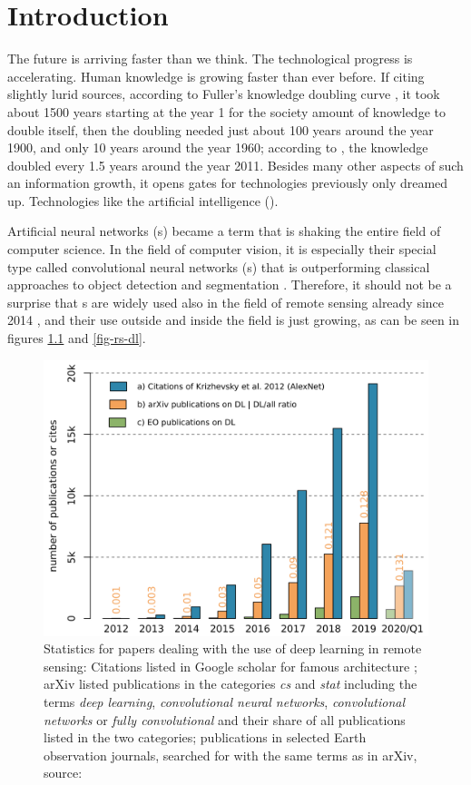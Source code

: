 \chapter{Introduction}
\label{intro}

The future is arriving faster than we think. The technological progress is accelerating. Human knowledge is growing faster than ever before. If citing slightly lurid sources, according to Fuller's knowledge doubling curve \cite{knowledge-doubling-curve}, it took about 1500 years starting at the year 1 for the society amount of knowledge to double itself, then the doubling needed just about 100 years around the year 1900, and only 10 years around the year 1960; according to \cite{growth-forecast}, the knowledge doubled every 1.5 years around the year 2011. Besides many other aspects of such an information growth, it opens gates for technologies previously only dreamed up. Technologies like the artificial intelligence ().

Artificial neural networks (s) became a term that is shaking the entire field of computer science. In the field of computer vision, it is especially their special type called convolutional neural networks (s) that is outperforming classical approaches to object detection and segmentation \cite{cnn-off-the-shelf}. Therefore, it should not be a surprise that s are widely used also in the field of remote sensing already since 2014 \cite{review-dl-rs-2017}, and their use outside and inside the field is just growing, as can be seen in figures \ref{fig-dl} and \ref{fig-rs-dl}.

\begin{figure}[h]
   \centering
	\includegraphics[width=0.55\linewidth]{./pictures/dl-papers.png}
	\caption[Papers on the use of DL]{Statistics for papers dealing with the use of deep learning in remote sensing: Citations listed in Google scholar for famous  architecture \cite{cnn-classification}; arXiv listed publications in the categories \textit{cs} and \textit{stat} including the terms \textit{deep learning}, \textit{convolutional neural networks}, \textit{convolutional networks} or \textit{fully convolutional} and their share of all publications listed in the two categories; publications in selected Earth observation journals, searched for with the same terms as in arXiv, source: \cite{review-dl-eo}}
      \label{fig-dl}
\end{figure}

